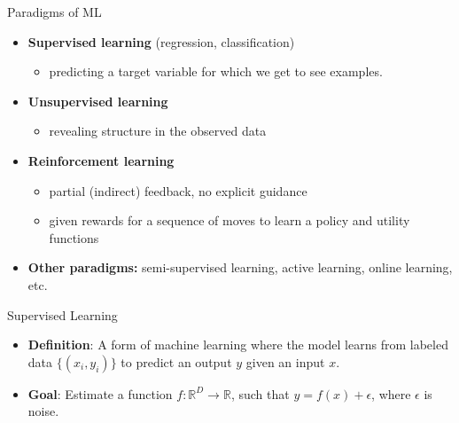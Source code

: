 \documentclass[serif, aspectratio=169]{beamer}
\begin{document}
\begin{frame}{Paradigms of ML}

\begin{minipage}{1.0\textwidth}
    \begin{itemize}
        \item \textbf{Supervised learning} (regression, classification)
        \begin{itemize}
            \item predicting a target variable for which we get to see examples.
        \end{itemize}
        \item \textbf{Unsupervised learning}
        \begin{itemize}
            \item revealing structure in the observed data
        \end{itemize}
        \item \textbf{Reinforcement learning}
        \begin{itemize}
            \item partial (indirect) feedback, no explicit guidance
            \item given rewards for a sequence of moves to learn a policy and utility functions
        \end{itemize}
        \item \textbf{Other paradigms:} semi-supervised learning, active learning, online learning, etc.
    \end{itemize}
\end{minipage}%
\end{frame}





\begin{frame}{Supervised Learning}
    \begin{itemize}
        \item \textbf{Definition}: A form of machine learning where the model learns from labeled data \( \{(x_i, y_i)\} \) to predict an output \( y \) given an input \( x \).
        \item \textbf{Goal}: Estimate a function \( f: \mathbb{R}^D \rightarrow \mathbb{R} \), such that \( y = f(x) + \epsilon \), where \( \epsilon \) is noise.
    \end{itemize}
\end{frame}
\end{document}

